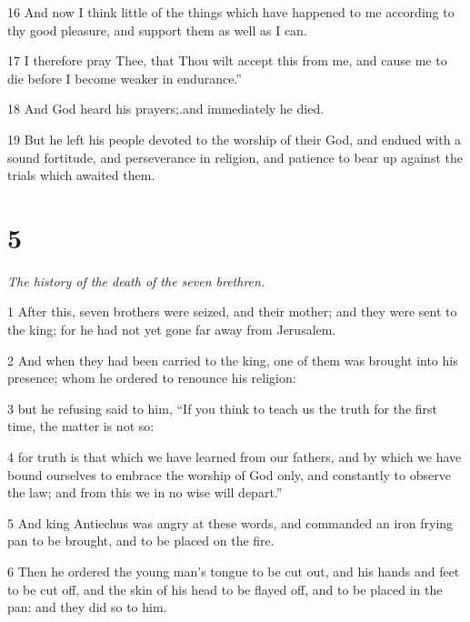 \par 16 And now I think little of the things which have happened to me according to thy good pleasure, and support them as well as I can. 

\par 17 I therefore pray Thee, that Thou wilt accept this from me, and cause me to die before I become weaker in endurance.” 

\par 18 And God heard his prayers;.and immediately he died. 

\par 19 But he left his people devoted to the worship of their God, and endued with a sound fortitude, and perseverance in religion, and patience to bear up against the trials which awaited them. 

\chapter{5}

\par \textit{The history of the death of the seven brethren.}

\par 1 After this, seven brothers were seized, and their mother; and they were sent to the king; for he had not yet gone far away from Jerusalem. 

\par 2 And when they had been carried to the king, one of them was brought into his presence; whom he ordered to renounce his religion: 

\par 3 but he refusing said to him, “If you think to teach us the truth for the first time, the matter is not so: 

\par 4 for truth is that which we have learned from our fathers, and by which we have bound ourselves to embrace the worship of God only, and constantly to observe the law; and from this we in no wise will depart.” 

\par 5 And king Antiechus was angry at these words, and commanded an iron frying pan to be brought, and to be placed on the fire. 

\par 6 Then he ordered the young man’s tongue to be cut out, and his hands and feet to be cut off, and the skin of his head to be flayed off, and to be placed in the pan: and they did so to him. 

